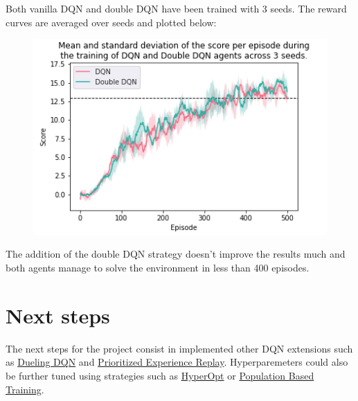 \documentclass{article}
\begin{document}
    Both vanilla DQN and double DQN have been trained with 3 seeds.
    The reward curves are averaged over seeds and plotted below:

    \begin{figure}
        \centering
        \includegraphics[scale=0.5]{results/reward_per_episode.png}\label{fig:figure}
    \end{figure}

    The addition of the double DQN strategy doesn't improve the results much and both
    agents manage to solve the environment in less than 400 episodes.

    \section{Next steps}\label{sec:next-steps}

    The next steps for the project consist in implemented other DQN extensions such as
    \href{https://arxiv.org/abs/1511.06581}{Dueling DQN} and
    \href{https://arxiv.org/abs/1511.05952}{Prioritized Experience Replay}.
    Hyperparemeters could also be further tuned using strategies such as
    \href{https://github.com/hyperopt/hyperopt}{HyperOpt} or
    \href{https://deepmind.com/blog/article/population-based-training-neural-networks}{Population Based Training}.
\end{document}
